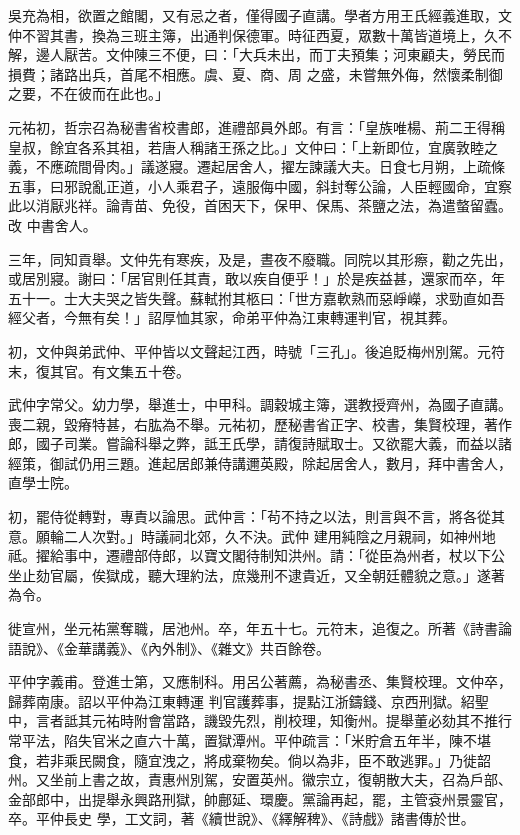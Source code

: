 \begin{pinyinscope}
 吳充為相，欲置之館閣，又有忌之者，僅得國子直講。學者方用王氏經義進取，文仲不習其書，換為三班主簿，出通判保德軍。時征西夏，眾數十萬皆道境上，久不解，邊人厭苦。文仲陳三不便，曰：「大兵未出，而丁夫預集；河東顧夫，勞民而損費；諸路出兵，首尾不相應。虞、夏、商、周
 之盛，未嘗無外侮，然懷柔制御之要，不在彼而在此也。」



 元祐初，哲宗召為秘書省校書郎，進禮部員外郎。有言：「皇族唯楊、荊二王得稱皇叔，餘宜各系其祖，若唐人稱諸王孫之比。」文仲曰：「上新即位，宜廣敦睦之義，不應疏間骨肉。」議遂寢。遷起居舍人，擢左諫議大夫。日食七月朔，上疏條五事，曰邪說亂正道，小人乘君子，遠服侮中國，斜封奪公論，人臣輕國命，宜察此以消厭兆祥。論青苗、免役，首困天下，保甲、保馬、茶鹽之法，為遣螫留蠹。改
 中書舍人。



 三年，同知貢舉。文仲先有寒疾，及是，晝夜不廢職。同院以其形瘵，勸之先出，或居別寢。謝曰：「居官則任其責，敢以疾自便乎！」於是疾益甚，還家而卒，年五十一。士大夫哭之皆失聲。蘇軾拊其柩曰：「世方嘉軟熟而惡崢嶸，求勁直如吾經父者，今無有矣！」詔厚恤其家，命弟平仲為江東轉運判官，視其葬。



 初，文仲與弟武仲、平仲皆以文聲起江西，時號「三孔」。後追貶梅州別駕。元符末，復其官。有文集五十卷。



 武仲字常父。幼力學，舉進士，中甲科。調穀城主簿，選教授齊州，為國子直講。喪二親，毀瘠特甚，右肱為不舉。元祐初，歷秘書省正字、校書，集賢校理，著作郎，國子司業。嘗論科舉之弊，詆王氏學，請復詩賦取士。又欲罷大義，而益以諸經策，御試仍用三題。進起居郎兼侍講邇英殿，除起居舍人，數月，拜中書舍人，直學士院。



 初，罷侍從轉對，專責以論思。武仲言：「茍不持之以法，則言與不言，將各從其意。願輪二人次對。」時議祠北郊，久不決。武仲
 建用純陰之月親祠，如神州地祗。擢給事中，遷禮部侍郎，以寶文閣待制知洪州。請：「從臣為州者，杖以下公坐止劾官屬，俟獄成，聽大理約法，庶幾刑不逮貴近，又全朝廷體貌之意。」遂著為令。



 徙宣州，坐元祐黨奪職，居池州。卒，年五十七。元符末，追復之。所著《詩書論語說》、《金華講義》、《內外制》、《雜文》共百餘卷。



 平仲字義甫。登進士第，又應制科。用呂公著薦，為秘書丞、集賢校理。文仲卒，歸葬南康。詔以平仲為江東轉運
 判官護葬事，提點江浙鑄錢、京西刑獄。紹聖中，言者詆其元祐時附會當路，譏毀先烈，削校理，知衡州。提舉董必劾其不推行常平法，陷失官米之直六十萬，置獄潭州。平仲疏言：「米貯倉五年半，陳不堪食，若非乘民闕食，隨宜洩之，將成棄物矣。倘以為非，臣不敢逃罪。」乃徙韶州。又坐前上書之故，責惠州別駕，安置英州。徽宗立，復朝散大夫，召為戶部、金部郎中，出提舉永興路刑獄，帥鄜延、環慶。黨論再起，罷，主管袞州景靈官，卒。平仲長史
 學，工文詞，著《續世說》、《繹解稗》、《詩戲》諸書傳於世。




\end{pinyinscope}
